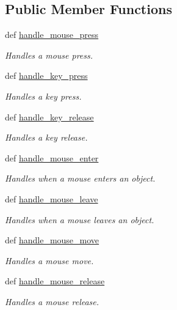 \subsection*{Public Member Functions}
\begin{DoxyCompactItemize}
\item 
def \hyperlink{classtext__move_1_1H2_a13611a7fe23eefc92b40ff3874e026bd}{handle\_\-mouse\_\-press}
\begin{DoxyCompactList}\small\item\em Handles a mouse press. \item\end{DoxyCompactList}\item 
def \hyperlink{classcs110graphics_1_1EventHandler_af3fb3531d0b23f1430a830586cd07906}{handle\_\-key\_\-press}
\begin{DoxyCompactList}\small\item\em Handles a key press. \item\end{DoxyCompactList}\item 
def \hyperlink{classcs110graphics_1_1EventHandler_a2849f60251baa44252992162521f2473}{handle\_\-key\_\-release}
\begin{DoxyCompactList}\small\item\em Handles a key release. \item\end{DoxyCompactList}\item 
def \hyperlink{classcs110graphics_1_1EventHandler_a13af3268f8a1aa36b8483eb2deffef15}{handle\_\-mouse\_\-enter}
\begin{DoxyCompactList}\small\item\em Handles when a mouse enters an object. \item\end{DoxyCompactList}\item 
def \hyperlink{classcs110graphics_1_1EventHandler_a5deaf2b6b8055e97ac0ddf6603132c64}{handle\_\-mouse\_\-leave}
\begin{DoxyCompactList}\small\item\em Handles when a mouse leaves an object. \item\end{DoxyCompactList}\item 
def \hyperlink{classcs110graphics_1_1EventHandler_a521fdcd170d15c0b8baa124c78b6d1ef}{handle\_\-mouse\_\-move}
\begin{DoxyCompactList}\small\item\em Handles a mouse move. \item\end{DoxyCompactList}\item 
def \hyperlink{classcs110graphics_1_1EventHandler_a320a7dbf68d37e0101b237bff1713088}{handle\_\-mouse\_\-release}
\begin{DoxyCompactList}\small\item\em Handles a mouse release. \item\end{DoxyCompactList}\end{DoxyCompactItemize}


